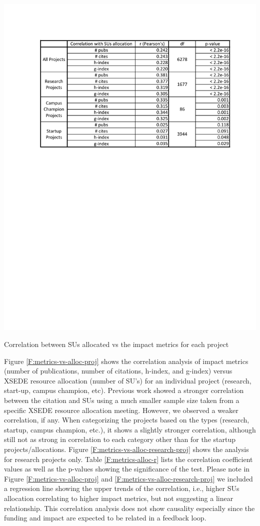 \documentclass{tex/sig-alternate}
\begin{document}
\begin{table}[!htb] 
  \centering 
    \includegraphics[width=1.0\columnwidth]{images/metrics_alloc_r.pdf} 
  \caption{Correlation between SUs allocated vs the impact metrics for each project}\label{F:metrics-alloc-r} 
\end{table} 
 
Figure \ref{F:metrics-vs-alloc-proj} shows the correlation analysis of impact metrics (number of publications, number of citations, h-index, and g-index) versus XSEDE resource allocation (number of SU's) for an individual project (research, start-up, campus champion, etc).  Previous work showed a stronger correlation between the citation and SUs \cite{bollen2011and} using a much smaller sample size taken from a specific XSEDE resource allocation meeting. However, we observed a weaker correlation, if any. When categorizing the projects based on the types (research, startup, campus champion, etc.), it shows a slightly stronger correlation,  although still not as strong in correlation to each category other than for the startup projects/allocations. Figure \ref{F:metrics-vs-alloc-research-proj} shows the analysis for research projects only. Table \ref{F:metrics-alloc-r} lists the correlation coefficient values as well as the p-values showing the significance of the test. Please note in Figure \ref{F:metrics-vs-alloc-proj} and \ref{F:metrics-vs-alloc-research-proj} we included a regression line showing the upper trends of the correlation, i.e., higher SUs allocation correlating to higher impact metrics, but not suggesting a linear relationship. This correlation analysis does not show causality especially since the funding and impact are expected to be related in a feedback loop. 
 
\end{document}
